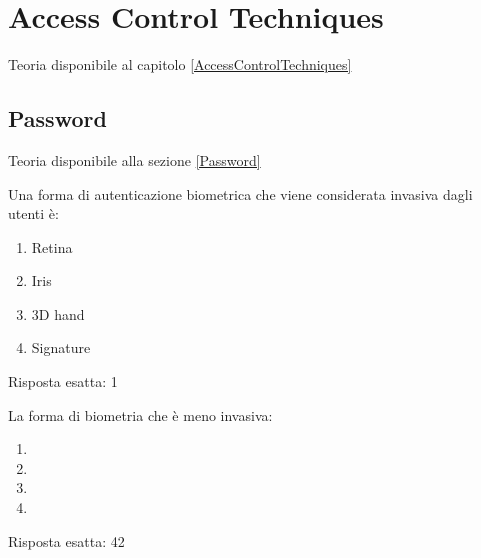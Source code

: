 \chapter{Access Control Techniques}

Teoria disponibile al capitolo \ref{AccessControlTechniques}

\section{Password}
\label{EsPass}

Teoria disponibile alla sezione \ref{Password}


\begin{Exercise} [
  title={Domanda},
  label={pass1}
 ]

 \Question Una forma di autenticazione biometrica che viene considerata
invasiva dagli utenti è:
\begin{enumerate}
 \item Retina
 \item Iris
 \item 3D hand
 \item Signature
\end{enumerate}

\end{Exercise}


\begin{Answer} [
  ref={pass1},
  number={1}
  ]

  \Question Risposta esatta: 1

\end{Answer}


\begin{Exercise} [
  title={Domanda},
  label={pass2}
 ]

 \Question La forma di biometria che è meno invasiva:
\begin{enumerate}
\item
\item
\item
\item
\end{enumerate}


\end{Exercise}


\begin{Answer} [
  ref={pass2},
  number={2}
  ]

  \Question Risposta esatta: 42

\end{Answer}

